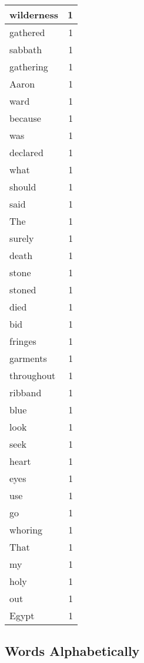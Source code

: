 \begin{center}
\begin{longtable}{l|r}
wilderness & 1 \\ \hline
gathered & 1 \\ \hline
sabbath & 1 \\ \hline
gathering & 1 \\ \hline
Aaron & 1 \\ \hline
ward & 1 \\ \hline
because & 1 \\ \hline
was & 1 \\ \hline
declared & 1 \\ \hline
what & 1 \\ \hline
should & 1 \\ \hline
said & 1 \\ \hline
The & 1 \\ \hline
surely & 1 \\ \hline
death & 1 \\ \hline
stone & 1 \\ \hline
stoned & 1 \\ \hline
died & 1 \\ \hline
bid & 1 \\ \hline
fringes & 1 \\ \hline
garments & 1 \\ \hline
throughout & 1 \\ \hline
ribband & 1 \\ \hline
blue & 1 \\ \hline
look & 1 \\ \hline
seek & 1 \\ \hline
heart & 1 \\ \hline
eyes & 1 \\ \hline
use & 1 \\ \hline
go & 1 \\ \hline
whoring & 1 \\ \hline
That & 1 \\ \hline
my & 1 \\ \hline
holy & 1 \\ \hline
out & 1 \\ \hline
Egypt & 1 \\ \hline
\end{longtable}
\end{center}



\normalsize



\subsection{Words Alphabetically}

